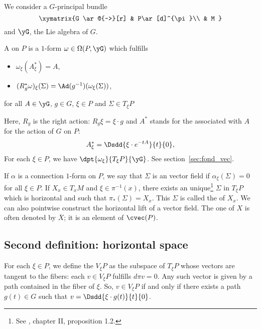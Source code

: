 \label{pg_connpriic}
We consider a $G$-principal bundle
\[
	\xymatrix{%
		G \ar@{~>}[r]		&	P\ar[d]^{\pi}\\
		&	  M
	}
\]
and $\yG$, the Lie algebra of $G$.

\begin{definition}
	A  on $P$  is a $1$-form $\omega\in\Omega(P,\yG)$ which fulfills

	\begin{itemize}\label{pg:def:conne}
		\item $\omega_{\xi}(A^*_{\xi})=A$,
		\item $(R_g^*\omega)_{\xi}(\Sigma)=\Ad(g^{-1})(\omega_{\xi}(\Sigma))$,
	\end{itemize}
	for all $A\in\yG$, $g\in G$, $\xi\in P$ and $\Sigma\in T_{\xi} P$
	\label{defconnform}
\end{definition}
Here, $R_g$ is the right action: $R_g\xi=\xi\cdot g$ and $A^*$ stands for the  associated with $A$ for the action of $G$ on $P$:
\begin{equation} \label{defastar}
	A^*_{\xi}=\Dsdd{ \xi\cdot e^{-tA} }{t}{0},
\end{equation}
For each $\xi\in P$, we have $\dpt{\omega_{\xi}}{T_{\xi} P}{\yG}$. See section~\ref{sec:fond_vec}.

If $\alpha$ is a connection $1$-form on $P$, we say that $\Sigma$ is an  vector field if $\alpha_{\xi}(\Sigma)=0$ for all $\xi\in P$. If $X_x\in T_xM$ and $\xi\in\pi^{-1}(x)$, there exists an unique\footnote{See \cite{kobayashi}, chapter II, proposition 1.2.} $\Sigma$ in $T_{\xi} P$ which is horizontal and such that $\pi_*(\Sigma)=X_x$. This $\Sigma$ is called the  of $X_x$. We can also pointwise construct the horizontal lift of a vector field. The one of $X$ is often denoted by $\overline{X}$; it is an element of $\cvec(P)$.

\subsection[Horizontal space]{Second definition: horizontal space}

For each $\xi\in P$, we define the  $V_{\xi} P$ as the subspace of $T_{\xi} P$ whose vectors are tangent to the fibers: each $v\in V_{\xi} P$ fulfills $d\pi v=0$. Any such vector is given by a path contained in the fiber of $\xi$. So, $v\in V_{\xi} P$ if and only if there exists a path $g(t)\in G$ such that $v=\Dsdd{\xi\cdot g(t)}{t}{0}$.

